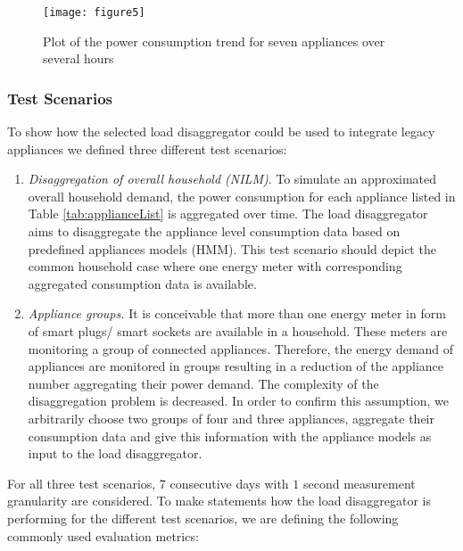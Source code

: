 \documentclass{article}
\begin{document}
\begin{figure}[h!]
\centering
\texttt{[image: figure5]}
\caption{Plot of the power consumption trend for seven appliances over several hours}
\label{fig:total}
\end{figure}

\subsubsection{Test Scenarios}
To show how the selected load disaggregator could be used to integrate legacy appliances we defined three different test scenarios:
\begin{enumerate}
  \item \textit{Disaggregation of overall household (\ac{NILM})}.
  To simulate an approximated overall household demand, the power consumption for each appliance listed in Table \ref{tab:applianceList} is aggregated over time.
  The load disaggregator aims to disaggregate the appliance level consumption data based on predefined appliances models (\ac{HMM}). 
  This test scenario should depict the common household case where one energy meter with corresponding aggregated consumption data is available.
  \item \textit{Appliance groups.}
  It is conceivable that more than one energy meter in form of smart plugs/ smart sockets are available in a household.
  These meters are monitoring a group of connected appliances.
  Therefore, the energy demand of appliances are monitored in groups resulting in a reduction of the appliance number aggregating their power demand.
 The complexity of the disaggregation problem is decreased.
  In order to confirm this assumption, we arbitrarily choose two groups of four and three appliances, aggregate their consumption data and give this information with the appliance models as input to the load disaggregator.
\end{enumerate}
For all three test scenarios, 7 consecutive days with $1$ second measurement granularity are considered.
To make statements how the load disaggregator is performing for the different test scenarios, we are defining the following commonly used evaluation metrics:
\end{document}

